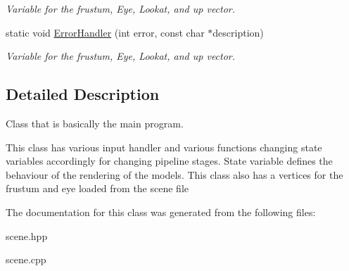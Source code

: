 \begin{DoxyCompactItemize}
\begin{DoxyCompactList}\small\item\em Variable for the frustum, Eye, Lookat, and up vector. \end{DoxyCompactList}\item 
static void \hyperlink{classcft_1_1Scene_afa38a8f4811fee97004b9c4f07d12f19}{Error\+Handler} (int error, const char $\ast$description)\hypertarget{classcft_1_1Scene_afa38a8f4811fee97004b9c4f07d12f19}{}\label{classcft_1_1Scene_afa38a8f4811fee97004b9c4f07d12f19}

\begin{DoxyCompactList}\small\item\em Variable for the frustum, Eye, Lookat, and up vector. \end{DoxyCompactList}\end{DoxyCompactItemize}


\subsection{Detailed Description}
Class that is basically the main program. 

This class has various input handler and various functions changing state variables accordingly for changing pipeline stages. State variable defines the behaviour of the rendering of the models. This class also has a vertices for the frustum and eye loaded from the scene file 

The documentation for this class was generated from the following files\+:\begin{DoxyCompactItemize}
\item 
scene.\+hpp\item 
scene.\+cpp\end{DoxyCompactItemize}
